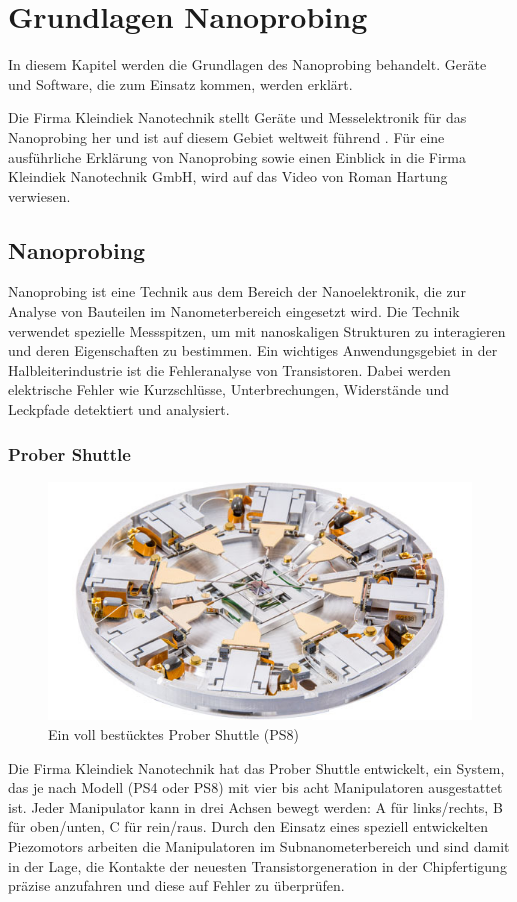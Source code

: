 \chapter{Grundlagen Nanoprobing}
In diesem Kapitel werden die Grundlagen des Nanoprobing behandelt. Geräte und Software, die zum Einsatz kommen, werden erklärt.

Die Firma Kleindiek Nanotechnik stellt Geräte und Messelektronik für das Nanoprobing her und ist auf diesem Gebiet weltweit führend \cite{kn}.
Für eine ausführliche Erklärung von Nanoprobing sowie einen Einblick in die Firma Kleindiek Nanotechnik GmbH, wird auf das Video von Roman Hartung verwiesen. \cite{youtube-derbauer} 

\section{Nanoprobing}
Nanoprobing ist eine Technik aus dem Bereich der Nanoelektronik, die zur Analyse von Bauteilen im Nanometerbereich eingesetzt wird. Die Technik verwendet spezielle Messspitzen, um mit nanoskaligen Strukturen zu interagieren und deren Eigenschaften zu bestimmen. Ein wichtiges Anwendungsgebiet in der Halbleiterindustrie ist die Fehleranalyse von Transistoren. Dabei werden elektrische Fehler wie Kurzschlüsse, Unterbrechungen, Widerstände und Leckpfade detektiert und analysiert.

\subsection{Prober Shuttle}
\begin{figure}[htbp]
\centerline{
\includegraphics[width=.7\textwidth, angle=0]{img/ps8.jpg}}
\caption{Ein voll bestücktes Prober Shuttle (PS8)}
\label{fig:PS8}
\begin{small}
\end{small}
\end{figure}
Die Firma Kleindiek Nanotechnik hat das Prober Shuttle entwickelt, ein System, das je nach Modell (PS4 oder PS8) mit vier bis acht Manipulatoren ausgestattet ist. Jeder Manipulator kann in drei Achsen bewegt werden: A für links/rechts, B für oben/unten, C für rein/raus. Durch den Einsatz eines speziell entwickelten Piezomotors arbeiten die Manipulatoren im Subnanometerbereich und sind damit in der Lage, die Kontakte der neuesten Transistorgeneration in der Chipfertigung präzise anzufahren und diese auf Fehler zu überprüfen.

